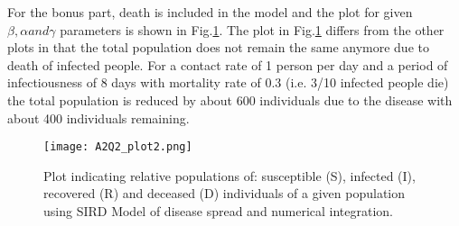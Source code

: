 \documentclass[apj]{emulateapj}
\begin{document}
\newpage
For the bonus part, death is included in the model and the plot for given $\beta, \alpha and \gamma$ parameters is shown in Fig.\ref{fig:Q2plot2}.
The plot in Fig.\ref{fig:Q2plot2} differs from the other plots in that the total population does not remain the same anymore due to death of infected people. For a contact rate of 1 person per day and a period of infectiousness of 8 days with mortality rate of 0.3 (i.e. 3/10 infected people die) the total population is reduced by about 600 individuals due to the disease with about 400 individuals remaining. 


\begin{figure}
    \centering
    \texttt{[image: A2Q2\_plot2.png]}
    \caption{Plot indicating relative populations of: susceptible (S), infected (I), recovered (R) and deceased (D) individuals of a given population using SIRD Model of disease spread and numerical integration.}
    \label{fig:Q2plot2}
\end{figure}
\end{document}
